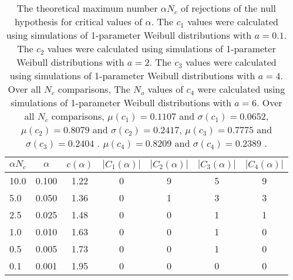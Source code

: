 \begin{table}[h!]
\begin{center}
\begin{tabular}{| l | c | c | c | c | c | c |}\hline
$\alpha N_c$ & $\alpha$ & $c(\alpha)$ & $|C_1(\alpha)|$ & $|C_2(\alpha)|$ & $|C_3(\alpha)|$ & $|C_4(\alpha)|$ \\\hline
10.0 & 0.100 & 1.22 & 0 & 9 & 5 & 9 \\\hline
5.0 & 0.050 & 1.36 & 0 & 1 & 3 & 3 \\\hline
2.5 & 0.025 & 1.48 & 0 & 0 & 1 & 1 \\\hline
1.0 & 0.010 & 1.63 & 0 & 0 & 1 & 0 \\\hline
0.5 & 0.005 & 1.73 & 0 & 0 & 1 & 0 \\\hline
0.1 & 0.001 & 1.95 & 0 & 0 & 0 & 0 \\\hline
\end{tabular}
\caption{The theoretical maximum number $\alpha N_c$ of rejections
        of the null hypothesis for critical values of $\alpha$.
        The $c_1$ values were calculated using simulations of 1-parameter Weibull distributions with $a=0.1$.
        The $c_2$ values were calculated using simulations of 1-parameter Weibull distributions with $a=2$.
        The $c_3$ values were calculated using simulations of 1-parameter Weibull distributions with $a=4$.
        Over all $N_c$ comparisons,
        The $N_o$ values of $c_4$ were calculated using simulations of
         1-parameter Weibull distributions with $a=6$.
        Over all $N_c$ comparisons,
         $\mu(c_1)=0.1107$ and $\sigma(c_1)=0.0652$,
         $\mu(c_2)=0.8079$ and $\sigma(c_2)=0.2417$,
         $\mu(c_3)=0.7775$ and $\sigma(c_3)=0.2404$ .
         $\mu(c_4)=0.8209$ and $\sigma(c_4)=0.2389$ .
        }
\end{center}
\end{table}